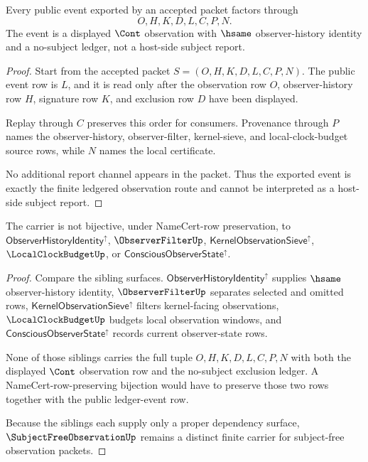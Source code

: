 \begin{theorem}
\label{thm:subject-free-observation-ledger-event}
Every public event exported by an accepted \SubjectFreeObservationUp packet factors through
$$
O,H,K,D,L,C,P,N.
$$
The event is a displayed $\Cont$ observation with $\hsame$ observer-history identity and a no-subject ledger, not a host-side subject report.
\end{theorem}
\begin{proof}
Start from the accepted packet $S=(O,H,K,D,L,C,P,N)$. The public event row is $L$, and it is read only after the observation row $O$, observer-history row $H$, signature row $K$, and exclusion row $D$ have been displayed.

Replay through $C$ preserves this order for consumers. Provenance through $P$ names the observer-history, observer-filter, kernel-sieve, and local-clock-budget source rows, while $N$ names the local certificate.

No additional report channel appears in the packet. Thus the exported event is exactly the finite ledgered observation route and cannot be interpreted as a host-side subject report.
\end{proof}

\begin{theorem}
\label{thm:subject-free-observation-sibling-independence}
The \SubjectFreeObservationUp carrier is not bijective, under NameCert-row preservation, to $\mathsf{ObserverHistoryIdentity}^{\uparrow}$, $\ObserverFilterUp$, $\mathsf{KernelObservationSieve}^{\uparrow}$, $\LocalClockBudgetUp$, or $\mathsf{ConsciousObserverState}^{\uparrow}$.
\end{theorem}
\begin{proof}
Compare the sibling surfaces. $\mathsf{ObserverHistoryIdentity}^{\uparrow}$ supplies $\hsame$ observer-history identity, $\ObserverFilterUp$ separates selected and omitted rows, $\mathsf{KernelObservationSieve}^{\uparrow}$ filters kernel-facing observations, $\LocalClockBudgetUp$ budgets local observation windows, and $\mathsf{ConsciousObserverState}^{\uparrow}$ records current observer-state rows.

None of those siblings carries the full tuple $O,H,K,D,L,C,P,N$ with both the displayed $\Cont$ observation row and the no-subject exclusion ledger. A NameCert-row-preserving bijection would have to preserve those two rows together with the public ledger-event row.

Because the siblings each supply only a proper dependency surface, $\SubjectFreeObservationUp$ remains a distinct finite carrier for subject-free observation packets.
\end{proof}

